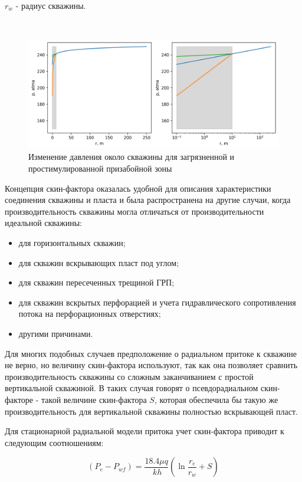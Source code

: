 $r_w$ - радиус скважины.

\

\begin{figure}[h!]
	\begin{center}
		\includegraphics[width=12cm]{pics/stac_pressure_dist_skin.png}
		\caption{Изменение давления около скважины для загрязненной и простимулированной призабойной зоны}
		\label{ris:stac_pressure_dist_skin}
	\end{center}
\end{figure}

Концепция скин-фактора оказалась удобной для описания характеристики соединения скважины и пласта и была распространена на другие случаи, когда производительность скважины могла отличаться от производительности идеальной скважины:
\begin{itemize}
	\item для горизонтальных скважин;
	\item для скважин вскрывающих пласт под углом;
	\item для скважин пересеченных трещиной ГРП;
	\item для скважин вскрытых перфорацией и учета гидравлического сопротивления потока на перфорационных отверстиях;
	\item другими причинами.
\end{itemize}

Для многих подобных случаев предположение о радиальном притоке к скважине не верно, но величину скин-фактора используют, так как она позволяет сравнить производительность скважины со сложным заканчиванием с простой вертикальной скважиной. В таких случая говорят о псевдорадиальном скин-факторе - такой величине скин-фактора $S$, которая обеспечила бы такую же производительность для вертикальной скважины полностью вскрывающей пласт. 

Для стационарной радиальной модели притока учет скин-фактора приводит к следующим соотношениям:

\begin{equation} \label{eq:dupui_skin_1}
(P_e - P_{wf}) = \frac{18.4\mu q }{\ k h}(\ln\frac{r_e}{r_w}+S) 
\end{equation}



